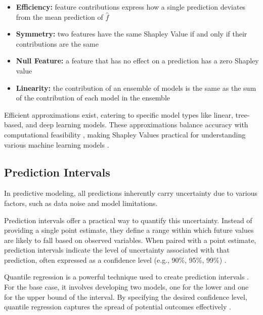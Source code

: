 \documentclass{IEEEtran}
\begin{document}
            \begin{itemize}
                \item \textbf{Efficiency:} feature contributions express how a single prediction deviates from the mean prediction of $\hat{f}$
                \item \textbf{Symmetry:} two features have the same Shapley Value if and only if their contributions are the same
                \item \textbf{Null Feature:} a feature that has no effect on a prediction has a zero Shapley value
                \item \textbf{Linearity:} the contribution of an ensemble of models is the same as the sum of the contribution of each model in the ensemble
            \end{itemize}

            Efficient approximations exist, catering to specific model types like linear, tree-based, and deep learning models. These approximations balance accuracy with computational feasibility \cite{chen2023algorithms} \cite{molnar2020interpretable} \cite{shap-feature-analysis}, making Shapley Values practical for understanding various machine learning models \cite{shap-health} \cite{shap-credit-lending} \cite{shap-extra-ml}.

        \subsection{Prediction Intervals} \label{sec:prediction_intervals}

            In predictive modeling, all predictions inherently carry uncertainty due to various factors, such as data noise and model limitations.

            Prediction intervals offer a practical way to quantify this uncertainty. Instead of providing a single point estimate, they define a range within which future values are likely to fall based on observed variables. When paired with a point estimate, prediction intervals indicate the level of uncertainty associated with that prediction, often expressed as a confidence level (e.g., 90\%, 95\%, 99\%) \cite{barron2022probability}.

            Quantile regression is a powerful technique used to create prediction intervals \cite{pi-stock} \cite{pi-wind-power} \cite{pi-dl-rul}. For the base case, it involves developing two models, one for the lower and one for the upper bound of the interval. By specifying the desired confidence level, quantile regression captures the spread of potential outcomes effectively \cite{romano2019conformalized} \cite{pi-motivation}.
\end{document}
